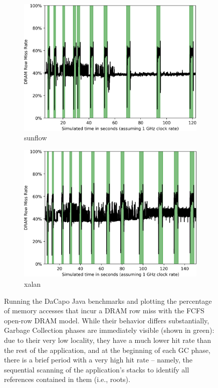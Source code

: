\begin{figure}
\begin{subfigure}[t]{0.23\textwidth}
		\includegraphics[width=\textwidth]{results/rowmisses_sunflow.png}
		\caption{sunflow}
	\end{subfigure}
	\begin{subfigure}[t]{0.23\textwidth}
		\includegraphics[width=\textwidth]{results/rowmisses_xalan.png}
		\caption{xalan}
	\end{subfigure}
    \caption{Running the DaCapo Java benchmarks and plotting the percentage of
    memory accesses that incur a DRAM row miss with the FCFS open-row DRAM
    model. While their behavior differs substantially, Garbage Collection
    phases are immediately visible (shown in green): due to their very low
    locality, they have a much lower hit rate than the rest of the application,
    and at the beginning of each GC phase, there is a brief period with a very
    high hit rate -- namely, the sequential scanning of the application's
    stacks to identify all references contained in them (i.e., roots).}
	\label{fig:java_rowmisses}
\end{figure}

